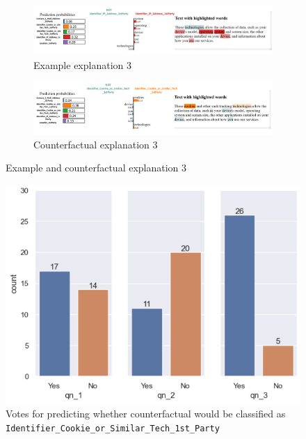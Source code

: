 \begin{figure}[!ht]
    \begin{subfigure}[b]{1\textwidth}
      \centering
      \includegraphics[width=1\linewidth]{figures/explanations_visualisations/counterfactual/3.4.png}
      \caption{Example explanation 3}
    \end{subfigure}
    \hfill
    \begin{subfigure}[b]{1\textwidth}
      \centering
      \includegraphics[width=1\linewidth]{figures/explanations_visualisations/counterfactual/3_4_counterfactual.png}
      \caption{Counterfactual explanation 3}
    \end{subfigure}
    \caption{Example and counterfactual explanation 3}
    \label{fig:part3_counterfactuals_example_3}
\end{figure}

\begin{figure}[!ht]
    \centering
    \includegraphics[width=1\linewidth]{figures/part_3_counterfactual.png}
    \caption{Votes for predicting whether counterfactual would be classified as \texttt{Identifier\_Cookie\_or\_Similar\_Tech\_1st\_Party}}
    \label{fig:part3_counterfactual}
\end{figure}

